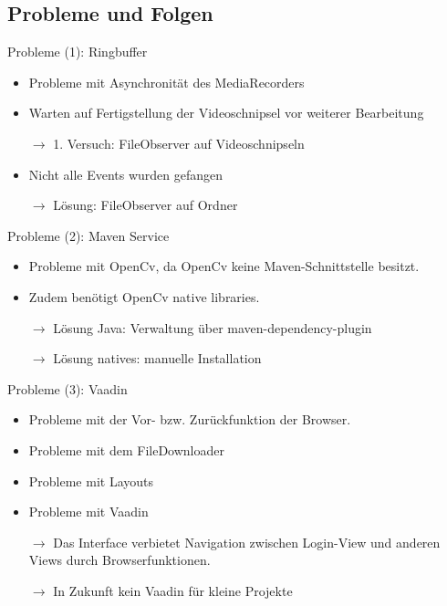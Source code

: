 \documentclass[19pt]{beamer}
\begin{document}
\subsection{Probleme und Folgen}
\begin{frame}{Probleme (1): Ringbuffer}
	\begin{itemize}
		\item Probleme mit Asynchronität des MediaRecorders
		\pause
		\item Warten auf Fertigstellung der Videoschnipsel vor weiterer Bearbeitung
		\pause
		\item[$\rightarrow$] 1. Versuch: FileObserver auf Videoschnipseln
		\pause
		\item Nicht alle Events wurden gefangen
		\pause
		\item[$\rightarrow$] Lösung: FileObserver auf Ordner
	\end{itemize}
\end{frame}

\begin{frame}{Probleme (2): Maven Service}
	\begin{itemize}
		\item Probleme mit OpenCv, da OpenCv keine Maven-Schnittstelle besitzt.
		\pause
		\item Zudem benötigt OpenCv native libraries.
		\pause
		\item[$\rightarrow$] Lösung Java: Verwaltung über maven-dependency-plugin
		\pause
		\item[$\rightarrow$] Lösung natives: manuelle Installation
	\end{itemize}
\end{frame}

\begin{frame}{Probleme (3): Vaadin}
	\begin{itemize}
		\item Probleme mit der Vor- bzw. Zurückfunktion der Browser.
		\pause
		\item Probleme mit dem FileDownloader
		\pause
		\item Probleme mit Layouts
		\pause
		\item Probleme mit Vaadin
		\pause
		\item[$\rightarrow$] Das Interface verbietet Navigation zwischen Login-View und anderen Views durch Browserfunktionen.
		\pause
		\item[$\rightarrow$] In Zukunft kein Vaadin für kleine Projekte
	\end{itemize}
\end{frame}
\end{document}
